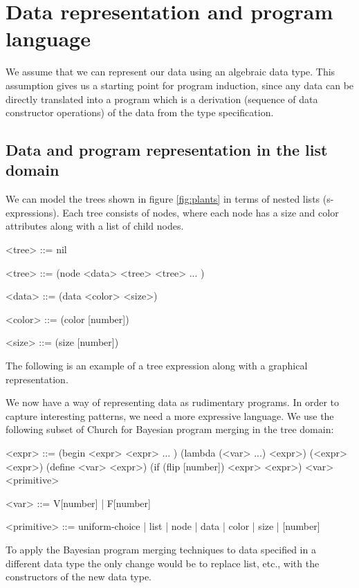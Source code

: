 \documentclass[a4paper,10pt]{article}
\begin{document}
\newpage
\section{Data representation and program language}
We assume that we can represent our data using an algebraic data type. This assumption gives us a starting point for program induction, since any data can be directly translated into a program which is a derivation (sequence of data constructor operations) of the data from the type specification. 
\subsection{Data and program representation in the list domain}
We can model the trees shown in figure \ref{fig:plants} in terms of nested lists (s-expressions).  Each tree consists of nodes, where each node has a size and color attributes along with a list of child nodes.
\begin{grammar}
<tree> ::= nil

<tree> ::= (node <data> <tree> <tree> ... )

<data> ::= (data <color> <size>)

<color> ::= (color [number])

<size> ::= (size [number])
\end{grammar}
The following is an example of a tree expression along with a graphical representation.
\begin{figure}[h]
  \subfloat{}
  \hspace{40pt} %
\end{figure}

We now have a way of representing data as rudimentary programs.  In order to capture interesting patterns, we need a more expressive language.  We use the following subset of Church for Bayesian program merging in the tree domain:
\begin{grammar}
<expr> ::= (begin <expr> <expr> ... ) 
\alt (lambda (<var> ...) <expr>)
\alt (<expr> <expr>)  
\alt (define <var> <expr>)
\alt (if (flip [number]) <expr> <expr>)
\alt <var> 
\alt <primitive>

<var> ::= V[number] | F[number] 

<primitive> ::= uniform-choice | list | node | data | color | size | [number]
\end{grammar}
To apply the Bayesian program merging techniques to data specified in a different data type the only change would be to replace list, etc., with the constructors of the new data type.
\end{document}
